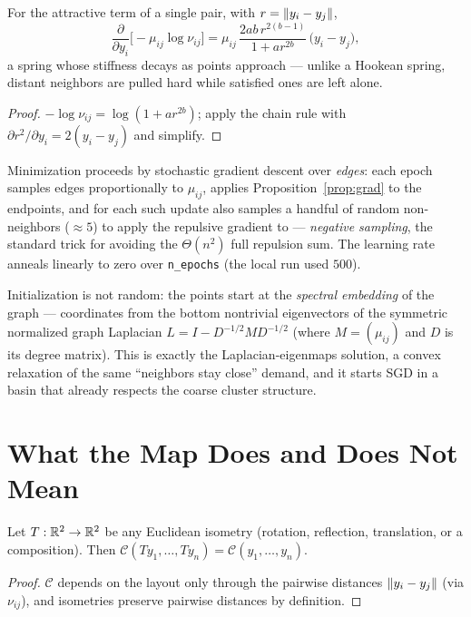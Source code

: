 \begin{proposition}\label{prop:grad}
For the attractive term of a single pair, with
$r = \lVert y_i - y_j\rVert$,
\[
\frac{\partial}{\partial y_i}
\Big[ -\mu_{ij} \log \nu_{ij} \Big]
= \mu_{ij}\,
\frac{2ab\, r^{2(b-1)}}{1 + a r^{2b}}\,
\big(y_i - y_j\big),
\]
a spring whose stiffness decays as points approach --- unlike a Hookean
spring, distant neighbors are pulled hard while satisfied ones are left
alone.
\end{proposition}

\begin{proof}
$-\log \nu_{ij} = \log(1 + a r^{2b})$; apply the chain rule with
$\partial r^2 / \partial y_i = 2(y_i - y_j)$ and simplify.
\end{proof}

Minimization proceeds by stochastic gradient descent over \emph{edges}: each
epoch samples edges proportionally to $\mu_{ij}$, applies
Proposition~\ref{prop:grad} to the endpoints, and for each such update also
samples a handful of random non-neighbors ($\approx 5$) to apply the
repulsive gradient to --- \emph{negative sampling}, the standard trick for
avoiding the $\Theta(n^2)$ full repulsion sum. The learning rate anneals
linearly to zero over \texttt{n\_epochs} (the local run used $500$).

Initialization is not random: the points start at the \emph{spectral
embedding} of the graph --- coordinates from the bottom nontrivial
eigenvectors of the symmetric normalized graph Laplacian
$L = I - D^{-1/2} M D^{-1/2}$ (where $M = (\mu_{ij})$ and $D$ is its degree
matrix). This is exactly the Laplacian-eigenmaps solution, a convex
relaxation of the same ``neighbors stay close'' demand, and it starts SGD in
a basin that already respects the coarse cluster structure.

\section{What the Map Does and Does Not Mean}

\begin{proposition}\label{prop:invariance}
Let $T : \mathbb{R}^2 \to \mathbb{R}^2$ be any Euclidean isometry (rotation, reflection,
translation, or a composition). Then
$\mathcal{C}(T y_1, \dots, T y_n) = \mathcal{C}(y_1, \dots, y_n)$.
\end{proposition}

\begin{proof}
$\mathcal{C}$ depends on the layout only through the pairwise distances
$\lVert y_i - y_j\rVert$ (via $\nu_{ij}$), and isometries preserve pairwise
distances by definition.
\end{proof}

